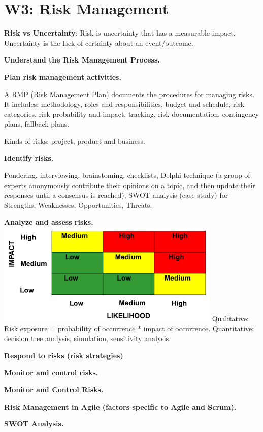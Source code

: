 \section{W3: Risk Management}

\textbf{Risk vs Uncertainty}: Risk is uncertainty that has a measurable impact. Uncertainty is the lack of certainty about an event/outcome.

\textbf{Understand the Risk Management Process.}

    \textbf{Plan risk management activities.}

    A RMP (Risk Management Plan) documents the procedures for managing risks. It includes: methodology, roles and responsibilities, budget and schedule, risk categories, risk probability and impact, tracking, risk documentation, contingency plans, fallback plans.

    Kinds of risks: project, product and business.

    \textbf{Identify risks.}

    Pondering, interviewing, brainstoming, checklists, Delphi technique (a group of experts anonymously contribute their opinions on a topic, and then update their responses until a consensus is reached), SWOT analysis (case study) for Strengths, Weaknesses, Opportunities, Threats.

    \textbf{Analyze and assess risks.}
    \includegraphics[width=\linewidth]{figs/SCR-20240605-sqml.png}
    Qualitative: Risk exposure = probability of occurrence * impact of occurrence.
    Quantitative: decision tree analysis, simulation, sensitivity analysis.


    \textbf{Respond to risks (risk strategies)}


    \textbf{Monitor and control risks.}


    \textbf{Monitor and Control Risks.}

    \textbf{Risk Management in Agile (factors specific to Agile and Scrum).}

    \textbf{SWOT Analysis.}
